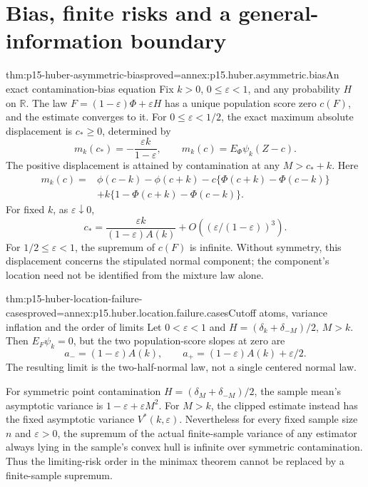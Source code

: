 \section{Bias, finite risks and a general-information boundary}
\label{sec:p15-huber-location-boundaries}

\begin{hbtheorem}{thm:p15-huber-asymmetric-bias}{proved=annex:p15.huber.asymmetric.bias}{An exact contamination-bias equation}
Fix \(k>0\), \(0\leq\varepsilon<1\), and any probability \(H\) on
\(\mathbb R\). The law
\(F=(1-\varepsilon)\Phi+\varepsilon H\) has a unique population
score zero \(c(F)\), and the estimate converges to it.
For \(0\leq\varepsilon<1/2\), the exact maximum absolute displacement
is \(c_*\geq0\), determined by
\[
 m_k(c_*)=-\frac{\varepsilon k}{1-\varepsilon},\qquad
 m_k(c)=E_\Phi\psi_k(Z-c).
\]
The positive displacement is attained by contamination at any
\(M>c_*+k\). Here
\[
\begin{split}
 m_k(c)={}&\phi(c-k)-\phi(c+k)
 -c\{\Phi(c+k)-\Phi(c-k)\}\\
 &+k\{1-\Phi(c+k)-\Phi(c-k)\}.
\end{split}
\]
For fixed \(k\), as \(\varepsilon\downarrow0\),
\[
 c_*=\frac{\varepsilon k}{(1-\varepsilon)A(k)}
          +O\!\left((\varepsilon/(1-\varepsilon))^3\right).
\]
For \(1/2\leq\varepsilon<1\), the supremum of \(c(F)\) is infinite.
Without symmetry, this displacement concerns the stipulated normal
component; the component's location need not be identified from the
mixture law alone.
\end{hbtheorem}

\begin{hbtheorem}{thm:p15-huber-location-failure-cases}{proved=annex:p15.huber.location.failure.cases}{Cutoff atoms, variance inflation and the order of limits}
Let \(0<\varepsilon<1\) and
\(H=(\delta_k+\delta_{-M})/2\), \(M>k\).
Then \(E_F\psi_k=0\), but the two population-score slopes at zero are
\[
 a_-=(1-\varepsilon)A(k),\qquad
 a_+=(1-\varepsilon)A(k)+\varepsilon/2.
\]
The resulting limit is the two-half-normal law, not a single centered
normal law.

For symmetric point contamination \(H=(\delta_M+\delta_{-M})/2\),
the sample mean's asymptotic variance is \(1-\varepsilon+\varepsilon M^2\).
For \(M>k\), the clipped estimate instead has the fixed asymptotic
variance \(V^*(k,\varepsilon)\).
Nevertheless for every fixed sample size \(n\) and \(\varepsilon>0\),
the supremum of the actual finite-sample variance of any estimator
always lying in the sample's convex hull is infinite over symmetric
contamination. Thus the limiting-risk order in the minimax theorem
cannot be replaced by a finite-sample supremum.
\end{hbtheorem}

